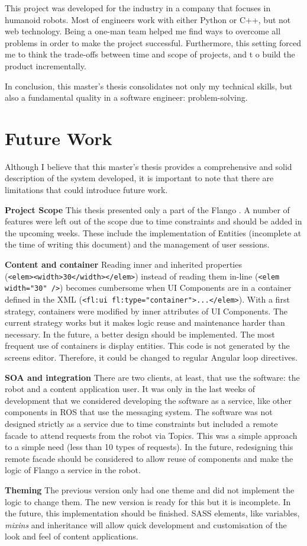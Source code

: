 This project was developed for the industry in a company that focuses in humanoid robots.
Most of engineers work with either Python or C++, but not web technology.
Being a one-man team helped me find ways to overcome all problems in order to make the project successful.
Furthermore, this setting forced me to think the trade-offs between time and scope of projects, and t o build the product incrementally.

In conclusion, this master's thesis consolidates not only my technical skills, but also a fundamental quality in a software engineer: problem-solving.


\section{Future Work}
Although I believe that this master's thesis provides a comprehensive and solid description of the system developed, it is important to note that there are limitations that could introduce future work.

\textbf{Project Scope} This thesis presented only a part of the Flango \cm . 
A number of features were left out of the scope due to time constraints and should be added in the upcoming weeks.
These include the implementation of Entities (incomplete at the time of writing this document) and the management of user sessions.

\textbf{Content and container} Reading inner and inherited properties \\(\lstinline$<elem><width>30</width></elem>$) instead of reading them in-line (\lstinline$<elem width="30" />$) becomes cumbersome when UI Components are in a container defined in the \ac{XML} (\lstinline$<fl:ui fl:type="container">...</elem>$).
With a first strategy, containers were modified by inner attributes of UI Components.
The current strategy works but it makes logic reuse and maintenance harder than necessary.
In the future, a better design should be implemented.
The most frequent use of containers is display entities.
This code is not generated by the screens editor. 
Therefore, it could be changed to regular Angular loop directives.

\textbf{SOA and integration} There are two clients, at least, that use the software: the robot and a content application user.
It was only in the last weeks of development that we considered developing the software as a service, like other components in \ac{ROS} that use the messaging system.
The software was not designed strictly as a service due to time constraints but included a remote facade to attend requests from the robot via Topics.
This was a simple approach to a simple need (less than 10 types of requests).
In the future, redesigning this remote facade should be considered to allow reuse of components and make the logic of Flango \cm a service in the robot.

\textbf{Theming} The previous version only had one theme and did not implement the logic to change them.
The new version is ready for this but it is incomplete.
In the future, this implementation should be finished.
\ac{SASS} elements, like variables, \textit{mixins} and inheritance will allow quick development and customisation of the look and feel of content applications.
